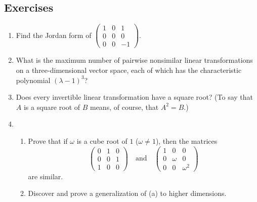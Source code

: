 {\small
\subsection*{Exercises}
\begin{enumerate}[wide]
    \item Find the Jordan form of \(\begin{pmatrix} 1 & 0 & 1 \\ 0 & 0 & 0 \\ 0 &
        0 & -1 \end{pmatrix}\).

    \item What is the maximum number of pairwise nonsimilar linear
    transformations on a three-dimensional vector space, each of which has the
    characteristic polynomial \((\lambda - 1)^3\)?

    \item Does every invertible linear transformation have a square root? (To
    say that \(A\) is a square root of \(B\) means, of course, that \(A^2 =
    B\).)

    \item \begin{enumerate}[label=(\alph*), wide, nosep]
        \item Prove that if \(\omega\) is a cube root of \(1\) (\(\omega \neq 1\)), then the matrices
        \begin{equation*}
            \begin{pmatrix}
                0 & 1 & 0 \\ 0 & 0 & 1 \\ 1 & 0 & 0
            \end{pmatrix} \quad \text{and} \quad
            \begin{pmatrix}
                1 & 0 & 0 \\ 0 & \omega & 0 \\ 0 & 0 & \omega^2
            \end{pmatrix}
        \end{equation*}
        are similar.
        \item Discover and prove a generalization of (a) to higher dimensions.
    \end{enumerate}


\end{enumerate}}
